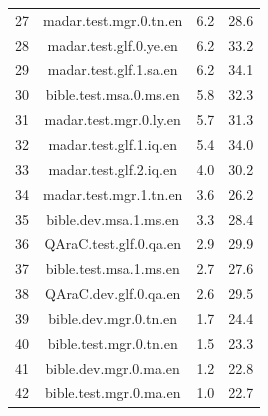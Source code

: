 \begin{table}[htbp]
\begin{tabular}{l@{\hspace{3pt}}c@{\hspace{3pt}}c@{\hspace{3pt}}c}
27 & madar.test.mgr.0.tn.en & 6.2 & 28.6 \\
28 & madar.test.glf.0.ye.en & 6.2 & 33.2 \\
29 & madar.test.glf.1.sa.en & 6.2 & 34.1 \\
30 & bible.test.msa.0.ms.en & 5.8 & 32.3 \\
31 & madar.test.mgr.0.ly.en & 5.7 & 31.3 \\
32 & madar.test.glf.1.iq.en & 5.4 & 34.0 \\
33 & madar.test.glf.2.iq.en & 4.0 & 30.2 \\
34 & madar.test.mgr.1.tn.en & 3.6 & 26.2 \\
35 & bible.dev.msa.1.ms.en & 3.3 & 28.4 \\
36 & QAraC.test.glf.0.qa.en & 2.9 & 29.9 \\
37 & bible.test.msa.1.ms.en & 2.7 & 27.6 \\
38 & QAraC.dev.glf.0.qa.en & 2.6 & 29.5 \\
39 & bible.dev.mgr.0.tn.en & 1.7 & 24.4 \\
40 & bible.test.mgr.0.tn.en & 1.5 & 23.3 \\
41 & bible.dev.mgr.0.ma.en & 1.2 & 22.8 \\
42 & bible.test.mgr.0.ma.en & 1.0 & 22.7 \\
\bottomrule
\end{tabular}
\end{table}